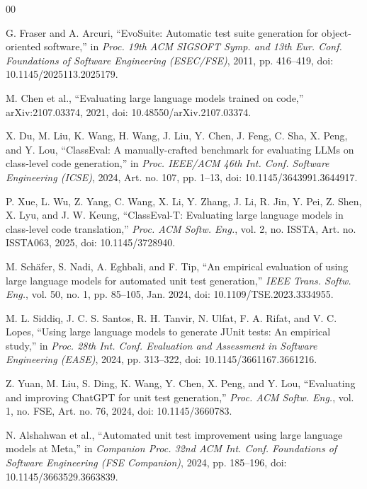 \begin{thebibliography}{00}

G. Fraser and A. Arcuri, ``EvoSuite: Automatic test suite generation for object-oriented software,'' in \emph{Proc. 19th ACM SIGSOFT Symp. and 13th Eur. Conf. Foundations of Software Engineering (ESEC/FSE)}, 2011, pp. 416--419, doi: 10.1145/2025113.2025179.

M. Chen et al., ``Evaluating large language models trained on code,'' arXiv:2107.03374, 2021, doi: 10.48550/arXiv.2107.03374.

X. Du, M. Liu, K. Wang, H. Wang, J. Liu, Y. Chen, J. Feng, C. Sha, X. Peng, and Y. Lou, ``ClassEval: A manually-crafted benchmark for evaluating LLMs on class-level code generation,'' in \emph{Proc. IEEE/ACM 46th Int. Conf. Software Engineering (ICSE)}, 2024, Art. no. 107, pp. 1--13, doi: 10.1145/3643991.3644917.

P. Xue, L. Wu, Z. Yang, C. Wang, X. Li, Y. Zhang, J. Li, R. Jin, Y. Pei, Z. Shen, X. Lyu, and J. W. Keung, ``ClassEval-T: Evaluating large language models in class-level code translation,'' \emph{Proc. ACM Softw. Eng.}, vol. 2, no. ISSTA, Art. no. ISSTA063, 2025, doi: 10.1145/3728940.

M. Sch\"afer, S. Nadi, A. Eghbali, and F. Tip, ``An empirical evaluation of using large language models for automated unit test generation,'' \emph{IEEE Trans. Softw. Eng.}, vol. 50, no. 1, pp. 85--105, Jan. 2024, doi: 10.1109/TSE.2023.3334955.

M. L. Siddiq, J. C. S. Santos, R. H. Tanvir, N. Ulfat, F. A. Rifat, and V. C. Lopes, ``Using large language models to generate JUnit tests: An empirical study,'' in \emph{Proc. 28th Int. Conf. Evaluation and Assessment in Software Engineering (EASE)}, 2024, pp. 313--322, doi: 10.1145/3661167.3661216.

Z. Yuan, M. Liu, S. Ding, K. Wang, Y. Chen, X. Peng, and Y. Lou, ``Evaluating and improving ChatGPT for unit test generation,'' \emph{Proc. ACM Softw. Eng.}, vol. 1, no. FSE, Art. no. 76, 2024, doi: 10.1145/3660783.

N. Alshahwan et al., ``Automated unit test improvement using large language models at Meta,'' in \emph{Companion Proc. 32nd ACM Int. Conf. Foundations of Software Engineering (FSE Companion)}, 2024, pp. 185--196, doi: 10.1145/3663529.3663839.


\end{thebibliography}
